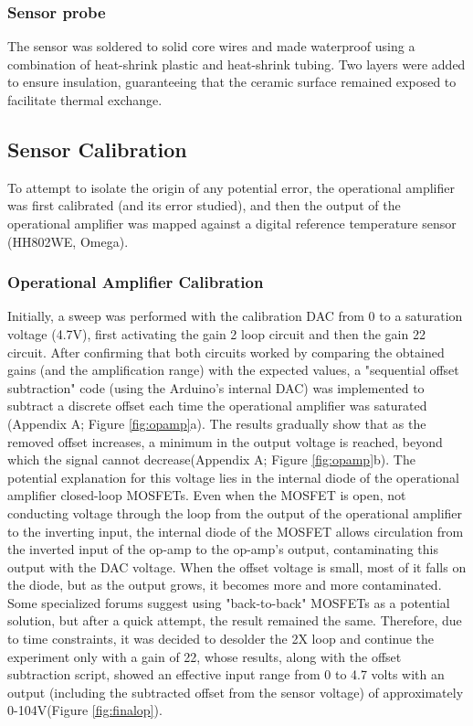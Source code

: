 \documentclass[conference]{IEEEtran}
\begin{document}
      \subsubsection{Sensor probe}
      The sensor was soldered to solid core wires and made waterproof using a combination of heat-shrink plastic and heat-shrink tubing. Two layers were added
      to ensure insulation, guaranteeing that the ceramic surface remained exposed to facilitate thermal exchange.
      \subsection{Sensor Calibration}
      To attempt to isolate the origin of any potential error, the operational amplifier was first calibrated (and its error studied), and then the output of the 
      operational amplifier was mapped against a digital reference temperature sensor (HH802WE, Omega).

      \subsubsection{Operational Amplifier Calibration}
      Initially, a sweep was performed with the calibration DAC from 0 to a saturation voltage (4.7V), first activating the gain 2 loop circuit and then the gain 22 circuit.
       After confirming that both circuits worked by comparing the obtained gains (and the amplification range) with the expected values, a "sequential offset subtraction" code 
       (using the Arduino's internal DAC) was implemented to subtract a discrete offset each time the operational amplifier was saturated (Appendix A; Figure \ref{fig:opamp}a). The results gradually show that as the 
       removed offset increases, a minimum in the output voltage is reached, beyond which the signal cannot decrease(Appendix A; Figure \ref{fig:opamp}b). The potential explanation for this voltage lies in the internal
        diode of the operational amplifier closed-loop MOSFETs. Even when the MOSFET is open, not conducting voltage through the loop from the output of the operational amplifier 
        to the inverting input, the internal diode of the MOSFET allows circulation from the inverted input of the op-amp to the op-amp's output, contaminating this output with the DAC voltage. 
        When the offset voltage is small, most of it falls on the diode, but as the output grows, it becomes more and more contaminated. Some specialized forums suggest using "back-to-back" MOSFETs\cite{BackBackMOSFET} 
        as a potential solution, but after a quick attempt, the result remained the same. Therefore, due to time constraints, it was decided to desolder the 2X loop and continue the experiment only with a 
        gain of 22, whose results, along with the offset subtraction script, showed an effective input range from 0 to 4.7 volts with an output (including the subtracted offset from the sensor voltage) 
        of approximately 0-104V(Figure \ref{fig:finalop}).
\end{document}
